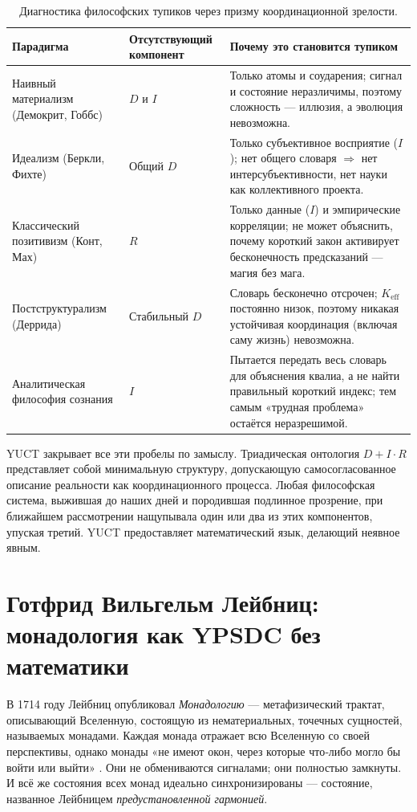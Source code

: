 \documentclass[12pt,a4paper]{article}
\begin{document}
	\begin{table}[htbp]
		\centering
		\caption{Диагностика философских тупиков через призму координационной зрелости.}
		\label{tab:dead-ends}
		\small
		\begin{tabular}{p{3cm} p{5.5cm} p{5.5cm}}
			\toprule
			\textbf{Парадигма} & \textbf{Отсутствующий компонент} & \textbf{Почему это становится тупиком} \\
			\midrule
			Наивный материализм (Демокрит, Гоббс) & \(D\) и \(I\) & Только атомы и соударения; сигнал и состояние неразличимы, поэтому сложность — иллюзия, а эволюция невозможна. \\
			Идеализм (Беркли, Фихте) & Общий \(D\) & Только субъективное восприятие (\(I\)); нет общего словаря \(\Rightarrow\) нет интерсубъективности, нет науки как коллективного проекта. \\
			Классический позитивизм (Конт, Мах) & \(R\) & Только данные (\(I\)) и эмпирические корреляции; не может объяснить, почему короткий закон активирует бесконечность предсказаний — магия без мага. \\
			Постструктурализм (Деррида) & Стабильный \(D\) & Словарь бесконечно отсрочен; \(K_{\mathrm{eff}}\) постоянно низок, поэтому никакая устойчивая координация (включая саму жизнь) невозможна. \\
			Аналитическая философия сознания & \(I\) & Пытается передать весь словарь для объяснения квалиа, а не найти правильный короткий индекс; тем самым «трудная проблема» остаётся неразрешимой. \\
			\bottomrule
		\end{tabular}
	\end{table}
	
	YUCT закрывает все эти пробелы по замыслу. Триадическая онтология \(D + I \cdot R\) представляет собой минимальную структуру, допускающую самосогласованное описание реальности как координационного процесса. Любая философская система, выжившая до наших дней и породившая подлинное прозрение, при ближайшем рассмотрении нащупывала один или два из этих компонентов, упуская третий. YUCT предоставляет математический язык, делающий неявное явным.
	
	\section{Готфрид Вильгельм Лейбниц: монадология как YPSDC без математики}
	
	В 1714 году Лейбниц опубликовал \emph{Монадологию} — метафизический трактат, описывающий Вселенную, состоящую из нематериальных, точечных сущностей, называемых монадами. Каждая монада отражает всю Вселенную со своей перспективы, однако монады «не имеют окон, через которые что‑либо могло бы войти или выйти» \cite{Leibniz1714}. Они не обмениваются сигналами; они полностью замкнуты. И всё же состояния всех монад идеально синхронизированы — состояние, названное Лейбницем \emph{предустановленной гармонией}.
	
\end{document}
